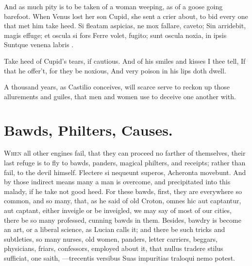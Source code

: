 And as much pity is to be taken of a woman weeping, as of a goose going
barefoot. When Venus lost her son Cupid, she sent a crier about, to bid
every one that met him take heed.
Si fleatam aspicias, ne mox fallare, caveto;
Sin arridebit, magis effuge; et oscula si fors
Ferre volet, fugito; sunt oscula noxia, in ipsis
Suntque venena labris \etc{}.

Take heed of Cupid's tears, if cautious.
And of his smiles and kisses I thee tell,
If that he offer't, for they be noxious,
And very poison in his lips doth dwell.

A thousand years, as Castilio conceives, will scarce serve to
reckon up those allurements and guiles, that men and women use to
deceive one another with.

\section{Bawds, Philters, Causes.}

\lettrine{W}{hen} all other engines fail, that they can proceed no farther of
themselves, their last refuge is to fly to bawds, panders, magical
philters, and receipts; rather than fail, to the devil himself.
Flectere si nequeunt superos, Acheronta movebunt. And by those indirect
means many a man is overcome, and precipitated into this malady, if he
take not good heed. For these bawds, first, they are everywhere so
common, and so many, that, as he said of old Croton, omnes hic
aut captantur, aut captant, either inveigle or be inveigled, we may say
of most of our cities, there be so many professed, cunning bawds in
them. Besides, bawdry is become an art, or a liberal science, as Lucian
calls it; and there be such tricks and subtleties, so many nurses, old
women, panders, letter carriers, beggars, physicians, friars,
confessors, employed about it, that nullus tradere stilus sufficiat,
one saith,
---trecentis versibus
Suas impuritias traloqui nemo potest.


